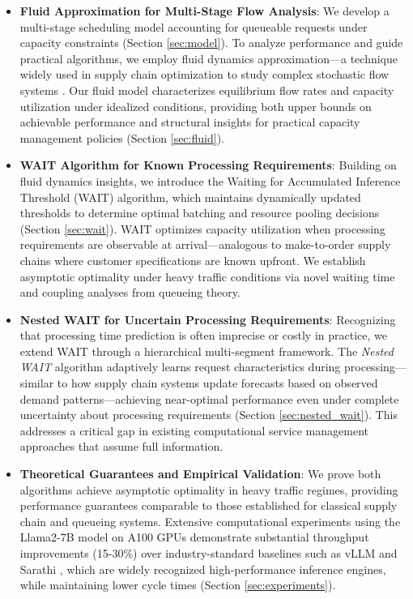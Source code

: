 \documentclass[poms,final,blindrev]{poms1_V1} %
\begin{document}
\begin{itemize}
\item \textbf{Fluid Approximation for Multi-Stage Flow Analysis}: We develop a multi-stage scheduling model accounting for queueable requests under capacity constraints (Section \ref{sec:model}). To analyze performance and guide practical algorithms, we employ fluid dynamics approximation—a technique widely used in supply chain optimization to study complex stochastic flow systems \citep{mandelbaum1998strong,maglaras2000discrete,bauerle2002optimal,liu2011network}. Our fluid model characterizes equilibrium flow rates and capacity utilization under idealized conditions, providing both upper bounds on achievable performance and structural insights for practical capacity management policies (Section \ref{sec:fluid}).

    \item \textbf{WAIT Algorithm for Known Processing Requirements}: Building on fluid dynamics insights, we introduce the Waiting for Accumulated Inference Threshold (WAIT) algorithm, which maintains dynamically updated thresholds to determine optimal batching and resource pooling decisions (Section \ref{sec:wait}). WAIT optimizes capacity utilization when processing requirements are observable at arrival—analogous to make-to-order supply chains where customer specifications are known upfront. We establish asymptotic optimality under heavy traffic conditions via novel waiting time and coupling analyses from queueing theory.

    \item \textbf{Nested WAIT for Uncertain Processing Requirements}: Recognizing that processing time prediction is often imprecise or costly in practice, we extend WAIT through a hierarchical multi-segment framework. The \textit{Nested WAIT} algorithm adaptively learns request characteristics during processing—similar to how supply chain systems update forecasts based on observed demand patterns—achieving near-optimal performance even under complete uncertainty about processing requirements (Section \ref{sec:nested_wait}). This addresses a critical gap in existing computational service management approaches that assume full information.
    
    \item \textbf{Theoretical Guarantees and Empirical Validation}: We prove both algorithms achieve asymptotic optimality in heavy traffic regimes, providing performance guarantees comparable to those established for classical supply chain and queueing systems. Extensive computational experiments using the Llama2-7B model on A100 GPUs demonstrate substantial throughput improvements (15-30\%) over industry-standard baselines such as vLLM \citep{kwon2023efficient} and Sarathi \citep{agrawal2023sarathi}, which are widely recognized high-performance inference engines, while maintaining lower cycle times (Section \ref{sec:experiments}).
\end{itemize}
\end{document}

